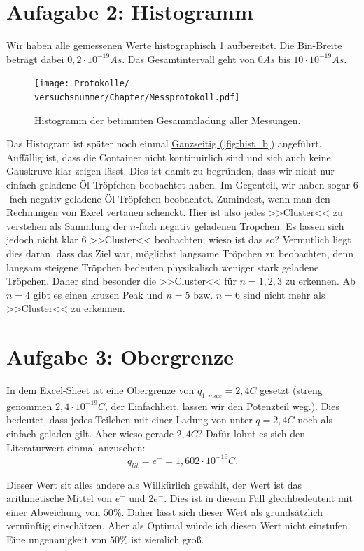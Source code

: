 \section{Aufagabe 2: Histogramm}
Wir haben alle gemessenen Werte \hyperref[fig:hist_s]{histographisch \ref*{fig:hist_s}} aufbereitet. Die Bin-Breite beträgt dabei $0,2 \cdot 10^{-19} As$. Das Gesamtintervall geht von $0 As$ bis $10 \cdot 10^{-19} As$. 
\begin{figure}[h]
    \centering
    \texttt{[image: Protokolle/\\versuchsnummer/Chapter/Messprotokoll.pdf]}
    \caption{Histogramm der betimmten Gesammtladung aller Messungen.}
    \label{fig:hist_s}
\end{figure}

Das Histogram ist später noch einmal \hyperref[fig:hist_b]{Ganzseitig (\ref*{fig:hist_b})} angeführt.
Auffällig ist, dass die Container nicht kontinuirlich sind und sich auch keine Gauskruve klar zeigen lässt.
Dies ist damit zu begründen, dass wir nicht nur einfach geladene Öl-Tröpfchen beobachtet haben. 
Im Gegenteil, wir haben sogar $6$-fach negativ geladene Öl-Tröpfchen beobachtet. Zumindest, wenn man den Rechnungen von Excel vertauen schenckt.
Hier ist also jedes >>Cluster<< zu verstehen als Sammlung der $n$-fach negativ geladenen Tröpchen.
Es lassen sich jedoch nicht klar 6 >>Cluster<< beobachten; wieso ist das so? Vermutlich liegt dies daran, dass das Ziel war, möglichst langsame Tröpchen zu beobachten, denn langsam steigene Tröpchen 
bedeuten physikalisch weniger stark geladene Tröpchen. Daher sind besonder die >>Cluster<< für $n= 1, 2, 3$ zu erkennen. Ab $n=4$ gibt es einen kruzen Peak und $n=5$ bzw. $n=6$ sind nicht mehr als >>Cluster<< zu erkennen.

\section{Aufgabe 3: Obergrenze}
In dem Excel-Sheet ist eine Obergrenze von $q_{1,max} =2,4C$ gesetzt (streng genommen $2,4 \cdot 10^{-19}C$, der Einfachheit, lassen wir den Potenzteil weg.). Dies bedeutet, dass jedes Teilchen mit einer Ladung von unter $q = 2,4C$ noch als einfach geladen gilt.
Aber wieso gerade $2,4C$? Dafür lohnt es sich den Literaturwert einmal anzusehen:
\begin{equation*}
    q_{lit} = e^- = 1,602 \cdot 10^{-19} C.
\end{equation*}

Dieser Wert sit alles andere als Willkürlich gewählt, der Wert ist das arithmetische Mittel von $e^-$ und $2e^-$. Dies ist in diesem Fall glecihbedeutent mit einer Abweichung von $50\%$.
Daher lässt sich dieser Wert als grundsätzlich vernünftig einschätzen. Aber als Optimal würde ich diesen Wert nicht einstufen. Eine ungenauigkeit von $50\%$ ist ziemlich groß.

